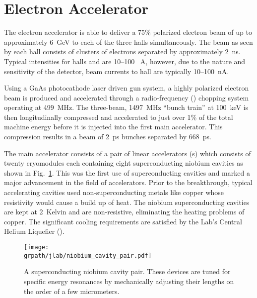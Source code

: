 \section{Electron Accelerator} \label{sec:clas.acc}

The  electron accelerator is able to deliver a 75\% polarized electron beam of up to approximately 6~GeV to each of the three halls simultaneously. The beam as seen by each hall consists of clusters of electrons separated by approximately 2~ns. Typical intensities for halls  and  are 10--100~\text{$\mu$} A, however, due to the nature and sensitivity of the  detector, beam currents to hall  are typically 10--100~nA.

Using a GaAs photocathode laser driven gun system, a highly polarized electron beam is produced and accelerated through a radio-frequency () chopping system operating at 499~MHz. The three-beam, 1497~MHz ``bunch train'' at 100~keV is then longitudinally compressed and accelerated to just over 1\% of the total machine energy before it is injected into the first main accelerator. This compression results in a beam of 2~ps bunches separated by 668~ps.

The main accelerator consists of a pair of linear accelerators (s\label{abbr:linac}) which consists of twenty cryomodules each containing eight superconducting niobium cavities as shown in Fig.~\ref{fig:jlab.cavity}. This was the first use of superconducting cavities and marked a major advancement in the field of accelerators. Prior to the  breakthrough, typical accelerating cavities used non-superconducting metals like copper whose resistivity would cause a build up of heat. The niobium superconducting cavities are kept at 2~Kelvin and are non-resistive, eliminating the heating problems of copper. The significant cooling requirements are satisfied by the Lab's Central Helium Liquefier (\label{abbr:chl}).

\begin{figure}\begin{center} 
\texttt{[image: \\grpath/jlab/niobium\_cavity\_pair.pdf]}
\caption[Niobium Cavity Pair (photograph)]{\label{fig:jlab.cavity}A superconducting niobium cavity pair. These devices are tuned for specific energy resonances by mechanically adjusting their lengths on the order of a few micrometers.}
\end{center}\end{figure}

